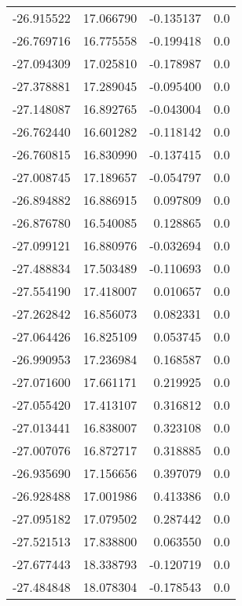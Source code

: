 \begin{tabular}{rrrr}
      -26.915522 &        17.066790 &   -0.135137 &   0.0 \\
      -26.769716 &        16.775558 &   -0.199418 &   0.0 \\
      -27.094309 &        17.025810 &   -0.178987 &   0.0 \\
      -27.378881 &        17.289045 &   -0.095400 &   0.0 \\
      -27.148087 &        16.892765 &   -0.043004 &   0.0 \\
      -26.762440 &        16.601282 &   -0.118142 &   0.0 \\
      -26.760815 &        16.830990 &   -0.137415 &   0.0 \\
      -27.008745 &        17.189657 &   -0.054797 &   0.0 \\
      -26.894882 &        16.886915 &    0.097809 &   0.0 \\
      -26.876780 &        16.540085 &    0.128865 &   0.0 \\
      -27.099121 &        16.880976 &   -0.032694 &   0.0 \\
      -27.488834 &        17.503489 &   -0.110693 &   0.0 \\
      -27.554190 &        17.418007 &    0.010657 &   0.0 \\
      -27.262842 &        16.856073 &    0.082331 &   0.0 \\
      -27.064426 &        16.825109 &    0.053745 &   0.0 \\
      -26.990953 &        17.236984 &    0.168587 &   0.0 \\
      -27.071600 &        17.661171 &    0.219925 &   0.0 \\
      -27.055420 &        17.413107 &    0.316812 &   0.0 \\
      -27.013441 &        16.838007 &    0.323108 &   0.0 \\
      -27.007076 &        16.872717 &    0.318885 &   0.0 \\
      -26.935690 &        17.156656 &    0.397079 &   0.0 \\
      -26.928488 &        17.001986 &    0.413386 &   0.0 \\
      -27.095182 &        17.079502 &    0.287442 &   0.0 \\
      -27.521513 &        17.838800 &    0.063550 &   0.0 \\
      -27.677443 &        18.338793 &   -0.120719 &   0.0 \\
      -27.484848 &        18.078304 &   -0.178543 &   0.0 \\

\end{tabular}
